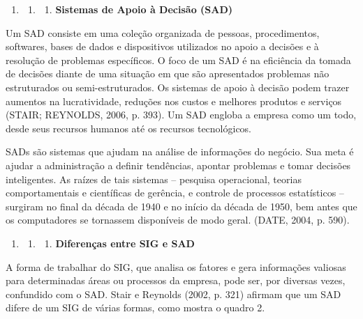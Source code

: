 \documentclass[a4paper]{article}
\newcounter{saveenum}
\newcommand\liststyleWWviiiNumi{%
\renewcommand\theenumi{\arabic{enumi}}
\renewcommand\theenumii{\arabic{enumi}.\arabic{enumii}}
\renewcommand\theenumiii{\arabic{enumi}.\arabic{enumii}.\arabic{enumiii}}
\renewcommand\theenumiv{\arabic{enumi}.\arabic{enumii}.\arabic{enumiii}.\arabic{enumiv}}
\renewcommand\labelenumi{\theenumi}
\renewcommand\labelenumii{\theenumii}
\renewcommand\labelenumiii{\theenumiii}
\renewcommand\labelenumiv{\theenumiv.}
}
\begin{document}
\bigskip

\liststyleWWviiiNumi
\begin{enumerate}
\item \begin{enumerate}
\item \begin{enumerate}
\item {
\textsf{\textbf{Sistemas de Apoio \`a Decis\~ao (SAD)}}}
\end{enumerate}
\end{enumerate}
\end{enumerate}
{
\textsf{Um SAD consiste em uma cole\c{c}\~ao organizada de pessoas, procedimentos, softwares, bases de dados e
dispositivos utilizados no apoio a decis\~oes e \`a resolu\c{c}\~ao de problemas espec\'ificos. O foco de um SAD \'e na
efici\^encia da tomada de decis\~oes diante de uma situa\c{c}\~ao em que s\~ao apresentados problemas n\~ao
estruturados ou semi-estruturados. Os sistemas de apoio \`a decis\~ao podem trazer aumentos na lucratividade,
redu\c{c}\~oes nos custos e melhores produtos e servi\c{c}os (STAIR; REYNOLDS, 2006, p. 393). Um SAD engloba a empresa
como um todo, desde seus recursos humanos at\'e os recursos tecnol\'ogicos. }}

{\sffamily
SADs s\~ao sistemas que ajudam na an\'alise de informa\c{c}\~oes do neg\'ocio. Sua meta \'e ajudar a administra\c{c}\~ao
a definir tend\^encias, apontar problemas e tomar decis\~oes inteligentes. As ra\'izes de tais sistemas -- pesquisa
operacional, teorias comportamentais e cient\'ificas de ger\^encia, e controle de processos estat\'isticos -- surgiram
no final da d\'ecada de 1940 e no in\'icio da d\'ecada de 1950, bem antes que os computadores se tornassem
dispon\'iveis de modo geral. (DATE, 2004, p. 590).}


\bigskip

\liststyleWWviiiNumi
\setcounter{saveenum}{\value{enumi}}
\begin{enumerate}
\setcounter{enumi}{\value{saveenum}}
\item \setcounter{saveenum}{\value{enumii}}
\begin{enumerate}
\setcounter{enumii}{\value{saveenum}}
\item \setcounter{saveenum}{\value{enumiii}}
\begin{enumerate}
\setcounter{enumiii}{\value{saveenum}}
\item {\sffamily\bfseries
Diferen\c{c}as entre SIG e SAD}
\end{enumerate}
\end{enumerate}
\end{enumerate}
{
\textsf{A forma de trabalhar do SIG, que analisa os fatores e gera informa\c{c}\~oes valiosas para determinadas \'areas
ou processos da empresa, pode ser, por diversas vezes, confundido com o SAD. Stair e Reynolds (2002, p. 321) afirmam
que um SAD difere de um SIG de v\'arias formas, como mostra o quadro 2.}}
\end{document}
